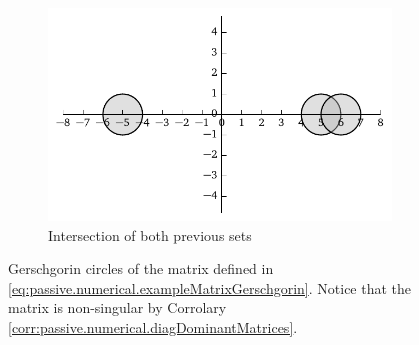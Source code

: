 \begin{figure}
 \begin{subfigure}{\textwidth}
  \centering
  \includegraphics{figs/passive/gerschgorin-full.pdf}
  \caption{Intersection of both previous sets}
 \end{subfigure}
 \caption[Gerschgorin circles for an example matrix]
	 {Gerschgorin circles of the matrix defined in \eqref{eq:passive.numerical.exampleMatrixGerschgorin}.
	 Notice that the matrix is non-singular by Corrolary \ref{corr:passive.numerical.diagDominantMatrices}.}
 \label{fig:passive.numerical.gerschgorinCircles}
\end{figure}

